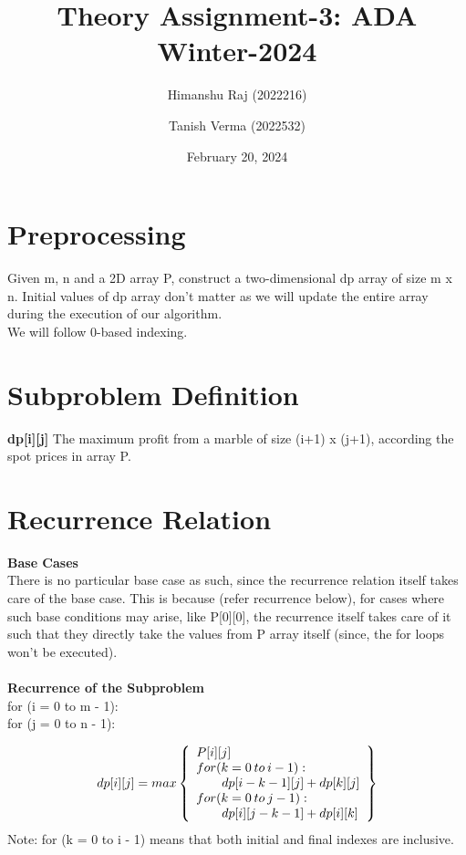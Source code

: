 \documentclass{article}
\title{Theory Assignment-3: ADA Winter-2024}
\author{Himanshu Raj (2022216) \and Tanish Verma (2022532)}
\date{February 20, 2024}
\begin{document}
\maketitle


\section{Preprocessing}
Given m, n and a 2D array P, construct a two-dimensional dp array of size m x n. Initial values of dp array don't matter as we will update the entire array during the execution of our algorithm.
\\We will follow 0-based indexing.


\section{Subproblem Definition}
\textbf{dp[i][j]} \textrightarrow The maximum profit from a marble of size (i+1) x (j+1), according the spot prices in array P.\\

\section{Recurrence Relation}
\textbf{Base Cases}\\
There is no particular base case as such, since the recurrence relation itself takes care of the base case. This is because (refer recurrence below), for cases where such base conditions may arise, like P[0][0], the recurrence itself takes care of it such that they directly take the values from P array itself (since, the for loops won't be executed).\\
\\
\textbf{Recurrence of the Subproblem}\\
for (i = 0 to m - 1):\\
\-\hspace{20pt} for (j = 0 to n - 1):

\[dp[i][j] = max\left\{\begin{array}{lr}
        P[i][j]\\
      for (k = 0\-\hspace{2pt} to\-\hspace{2pt} i - 1):\\
      \hspace{20pt}dp[i - k - 1][j] + dp[k][j]\\
      for (k = 0\-\hspace{2pt}to\-\hspace{2pt} j - 1): \\
      \hspace{20pt}dp[i][j - k - 1] + dp[i][k]
        \end{array}\right\}
  \]
  Note: for (k = 0 to i - 1) means that both initial and final indexes are inclusive.\\
\end{document}
